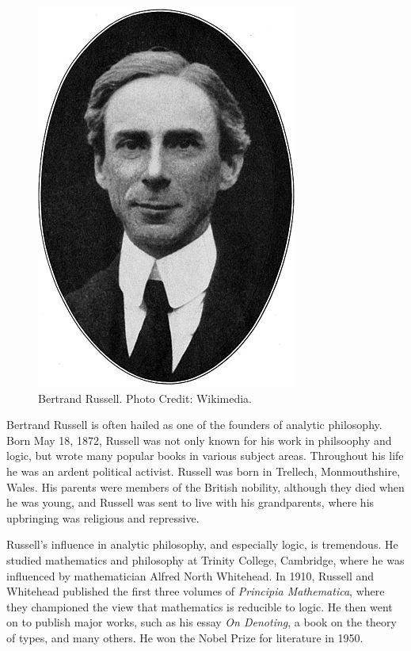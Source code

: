 \documentclass[../../../include/open-logic-section]{subfiles}
\begin{document}

\begin{figure}[h!] 
\centering
\includegraphics[scale=0.5]{bertrand-russell.jpg} 
\caption{Bertrand Russell. Photo Credit: Wikimedia.} 
\end{figure}
Bertrand Russell is often hailed as one of the founders of analytic philosophy.
Born May 18, 1872, Russell was not only known for his work in philsoophy and logic,
but wrote many popular books in various subject areas. Throughout his life he
was an ardent political activist.
Russell was born in Trellech, Monmouthshire, Wales. His parents were members of 
the British nobility, although they died when he was young, and Russell was sent to 
live with his grandparents, where his upbringing was religious and repressive.

Russell's influence in analytic philosophy, and especially logic, is tremendous. He studied
mathematics and philosophy at Trinity College, Cambridge, where he was influenced by
mathematician Alfred North Whitehead. In 1910, Russell and Whitehead published the
first three volumes of \emph{Principia Mathematica}, where they championed the view
that mathematics is reducible to logic. He then went on to publish major works, such as
his essay \emph{On Denoting}, a book on the theory of types, and many others.
He won the Nobel Prize for literature in 1950.
\end{document}
